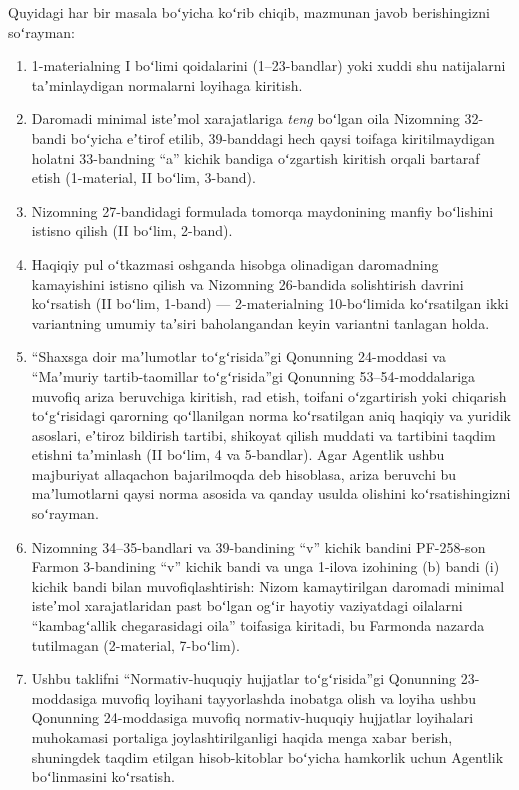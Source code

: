 \documentclass[14pt,a4paper]{extarticle}
\begin{document}
Quyidagi har bir masala boʻyicha koʻrib chiqib, mazmunan javob berishingizni soʻrayman:
\begin{enumerate}[leftmargin=1.27cm,label=\arabic*.]
\item 1-materialning I boʻlimi qoidalarini (1–23-bandlar) yoki xuddi shu natijalarni taʼminlaydigan normalarni loyihaga kiritish.
\item Daromadi minimal isteʼmol xarajatlariga \textit{teng} boʻlgan oila Nizomning 32-bandi boʻyicha eʼtirof etilib, 39-banddagi hech qaysi toifaga kiritilmaydigan holatni 33-bandning “a” kichik bandiga oʻzgartish kiritish orqali bartaraf etish (1-material, II boʻlim, 3-band).
\item Nizomning 27-bandidagi formulada tomorqa maydonining manfiy boʻlishini istisno qilish (II boʻlim, 2-band).
\item Haqiqiy pul oʻtkazmasi oshganda hisobga olinadigan daromadning kamayishini istisno qilish va Nizomning 26-bandida solishtirish davrini koʻrsatish (II boʻlim, 1-band) — 2-materialning 10-boʻlimida koʻrsatilgan ikki variantning umumiy taʼsiri baholangandan keyin variantni tanlagan holda.
\item “Shaxsga doir maʼlumotlar toʻgʻrisida”gi Qonunning 24-moddasi va “Maʼmuriy tartib-taomillar toʻgʻrisida”gi Qonunning 53–54-moddalariga muvofiq ariza beruvchiga kiritish, rad etish, toifani oʻzgartirish yoki chiqarish toʻgʻrisidagi qarorning qoʻllanilgan norma koʻrsatilgan aniq haqiqiy va yuridik asoslari, eʼtiroz bildirish tartibi, shikoyat qilish muddati va tartibini taqdim etishni taʼminlash (II boʻlim, 4 va 5-bandlar). Agar Agentlik ushbu majburiyat allaqachon bajarilmoqda deb hisoblasa, ariza beruvchi bu maʼlumotlarni qaysi norma asosida va qanday usulda olishini koʻrsatishingizni soʻrayman.
\item Nizomning 34–35-bandlari va 39-bandining “v” kichik bandini PF-258-son Farmon 3-bandining “v” kichik bandi va unga 1-ilova izohining (b) bandi (i) kichik bandi bilan muvofiqlashtirish: Nizom kamaytirilgan daromadi minimal isteʼmol xarajatlaridan past boʻlgan ogʻir hayotiy vaziyatdagi oilalarni “kambagʻallik chegarasidagi oila” toifasiga kiritadi, bu Farmonda nazarda tutilmagan (2-material, 7-boʻlim).
\item Ushbu taklifni “Normativ-huquqiy hujjatlar toʻgʻrisida”gi Qonunning 23-moddasiga muvofiq loyihani tayyorlashda inobatga olish va loyiha ushbu Qonunning 24-moddasiga muvofiq normativ-huquqiy hujjatlar loyihalari muhokamasi portaliga joylashtirilganligi haqida menga xabar berish, shuningdek taqdim etilgan hisob-kitoblar boʻyicha hamkorlik uchun Agentlik boʻlinmasini koʻrsatish.
\end{enumerate}
\end{document}
